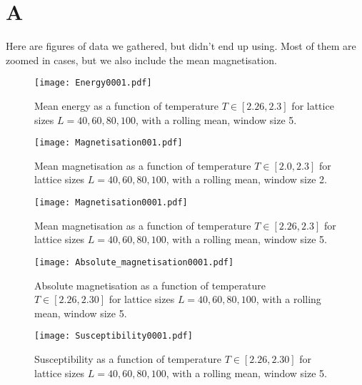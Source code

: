 \setcounter{equation}{0}
\renewcommand\theequation{A.\arabic{equation}}
\section*{A}
\label{sec:appendix}

Here are figures of data we gathered, but didn't end up using. Most of them are zoomed in cases, but we also include the mean magnetisation.

\begin{figure}[htbp]
	\centering
	\texttt{[image: Energy0001.pdf]}
	\caption{Mean energy as a function of temperature $T\in[2.26, 2.3]$ for lattice sizes $L= 40, 60, 80, 100$, with a rolling mean, window size 5.}
\end{figure}

\begin{figure}[htbp]
	\centering
	\texttt{[image: Magnetisation001.pdf]}
	\caption{Mean magnetisation as a function of temperature $T\in[2.0, 2.3]$ for lattice sizes $L= 40, 60, 80, 100$, with a rolling mean, window size 2.}
\end{figure}

\begin{figure}[htbp]
	\centering
	\texttt{[image: Magnetisation0001.pdf]}
	\caption{Mean magnetisation as a function of temperature $T\in[2.26, 2.3]$ for lattice sizes $L= 40, 60, 80, 100$, with a rolling mean, window size 5.}
\end{figure}

\begin{figure}[htbp]
	\centering
	\texttt{[image: Absolute\_magnetisation0001.pdf]}
	\caption{Absolute magnetisation as a function of temperature $T\in[2.26, 2.30]$ for lattice sizes $L= 40, 60, 80, 100$, with a rolling mean, window size 5.}
\end{figure}

\begin{figure}[htbp]
	\centering
	\texttt{[image: Susceptibility0001.pdf]}
	\caption{Susceptibility as a function of temperature $T\in[2.26, 2.30]$ for lattice sizes $L= 40, 60, 80, 100$, with a rolling mean, window size 5.}
\end{figure}
